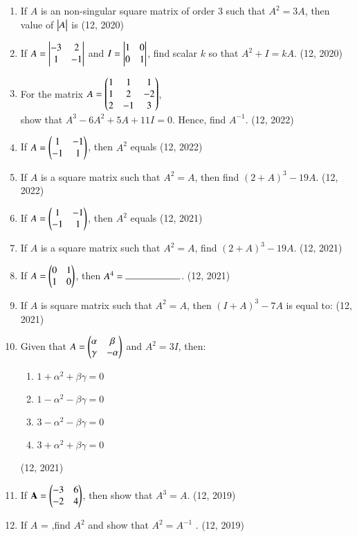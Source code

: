 \begin{enumerate}[label=\thesubsection.\arabic*,ref=\thesubsection.\theenumi]
\item If $A$ is an non-singular square matrix  of order $3$ such that $A^2=3A$, then value of $\begin{vmatrix}A\end{vmatrix}$ is
\hfill (12, 2020)
\item If $A=\begin{vmatrix}-3&2\\ 1&-1\end{vmatrix}$ and $I=\begin{vmatrix}1&0\\ 0&1\end{vmatrix}$, find scalar $k$ so that $A^2+I=kA$.
\hfill (12, 2020)
\item For the matrix $A = \begin{pmatrix}1&1&1\\1&2&-2\\2&-1&3\end{pmatrix}$, \\show that $A^3 -6A^2 + 5A +11I = 0$. Hence, find $A^{-1}$.
\hfill (12, 2022)
\item If $A=\begin{pmatrix}1&-1\\-1&1\end{pmatrix}$, then $A^2$ equals 
\hfill (12, 2022)
\item If $A$ is a square matrix such that $A^2=A$, then find $(2+A)^3 -19A$.
\hfill (12, 2022)
    \item If $A = \begin{pmatrix}1 & -1 \\ -1 & 1\end{pmatrix}$, then $A^2$ equals
\hfill (12, 2021)
    \item If $A$ is a square matrix such that $A^2 = A$, find $(2+A)^3 - 19A$.
\hfill (12, 2021)
    \item If $A = \begin{pmatrix}0 & 1 \\ 1 & 0\end{pmatrix}$, then $A^4 = \rule{2cm}{0.15mm}$.
\hfill (12, 2021)
    \item If $A$ is square matrix such that $A^2 = A$, then $(I + A)^3 - 7A$ is equal to:
\hfill (12, 2021)
    \item Given that $A = \begin{pmatrix}\alpha & \beta \\ \gamma & -\alpha\end{pmatrix}$ and $A^2 = 3I$, then:
    \begin{enumerate}
        \item $1 + \alpha^2 + \beta\gamma = 0$
        \item $1 - \alpha^2 - \beta\gamma = 0$
        \item $3 - \alpha^2 - \beta\gamma = 0$
        \item $3 + \alpha^2 + \beta\gamma = 0$
    \end{enumerate}
\hfill (12, 2021)
\item If $\mathbf{A} = \begin{pmatrix}-3&6\\-2&4\end{pmatrix}$, then show that $A^3= A$.
\hfill (12, 2019)
\item If $A$ =  ,find $A^{2}$ and show that $A^{2} = A^{-1}$ .
\hfill (12, 2019)
\end{enumerate}
